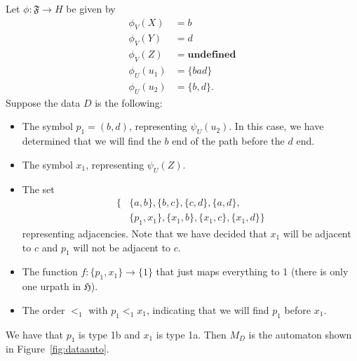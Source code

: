 \documentclass{article}
\newcommand{\Ff}{\mathfrak{F}}
\newcommand{\Hf}{\mathfrak{H}}
\newcommand{\ud}{\mathbf{undefined}}
\begin{document}
Let $\phi:\Ff\to H$ be given by
\begin{align*}
    \phi_V(X) &= b \\
    \phi_V(Y) &= d \\
    \phi_V(Z) &= \ud \\
    \phi_U(u_1) &= \{bad\} \\
    \phi_U(u_2) &= \{b,d\}.
\end{align*}
Suppose the data $D$ is the following:
\begin{itemize}
    \item The symbol $p_1=(b,d)$, representing $\psi_U(u_2)$. In this case, we have determined that we will find the $b$ end of the path before the $d$ end.
    \item The symbol $x_1$, representing $\psi_U(Z)$.
    \item The set
    \begin{align*}
        \big\{&\{a,b\}, \{b,c\}, \{c,d\}, \{a,d\}, \\
        &\{p_1,x_1\}, \{x_1,b\}, \{x_1,c\}, \{x_1,d\}\big\}
    \end{align*}
    representing adjacencies. Note that we have decided that $x_1$ will be adjacent to $c$ and $p_1$ will not be adjacent to $c$.
    \item The function $f:\{p_1,x_1\}\to\{1\}$ that just maps everything to 1 (there is only one urpath in $\Hf$).
    \item The order $<_1$ with $p_1<_1x_1$, indicating that we will find $p_1$ before $x_1$.
\end{itemize}
We have that $p_1$ is type 1b and $x_1$ is type 1a. Then $M_D$ is the automaton shown in Figure~\ref{fig:dataauto}.
\end{document}
